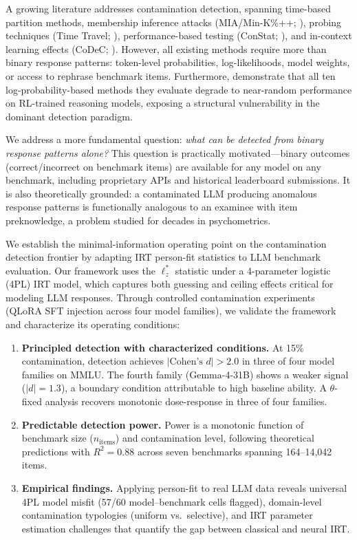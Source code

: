 \documentclass[11pt,a4paper]{article}
\begin{document}
A growing literature addresses contamination detection, spanning time-based partition methods, membership inference attacks (MIA/Min-K\%++; \citealp{shi2024detecting}), probing techniques (Time Travel; \citealp{deng2024investigating}), performance-based testing (ConStat; \citealp{oren2024proving}), and in-context learning effects (CoDeC; \citealp{dong2024codec}).
However, all existing methods require more than binary response patterns: token-level probabilities, log-likelihoods, model weights, or access to rephrase benchmark items.
Furthermore, \citet{wang2025rlcontam} demonstrate that all ten log-probability-based methods they evaluate degrade to near-random performance on RL-trained reasoning models, exposing a structural vulnerability in the dominant detection paradigm.

We address a more fundamental question: \emph{what can be detected from binary response patterns alone?}
This question is practically motivated---binary outcomes (correct/incorrect on benchmark items) are available for any model on any benchmark, including proprietary APIs and historical leaderboard submissions.
It is also theoretically grounded: a contaminated LLM producing anomalous response patterns is functionally analogous to an examinee with item preknowledge, a problem studied for decades in psychometrics.

We establish the minimal-information operating point on the contamination detection frontier by adapting IRT person-fit statistics \citep{drasgow1985appropriateness,snijders2001item} to LLM benchmark evaluation.
Our framework uses the $\ell_z^*$ statistic under a 4-parameter logistic (4PL) IRT model, which captures both guessing and ceiling effects critical for modeling LLM responses.
Through controlled contamination experiments (QLoRA SFT injection across four model families), we validate the framework and characterize its operating conditions:

\begin{enumerate}
\item \textbf{Principled detection with characterized conditions.} At 15\% contamination, detection achieves $|\text{Cohen's } d| > 2.0$ in three of four model families on MMLU.
The fourth family (Gemma-4-31B) shows a weaker signal ($|d|=1.3$), a boundary condition attributable to high baseline ability.
A $\theta$-fixed analysis recovers monotonic dose-response in three of four families.

\item \textbf{Predictable detection power.} Power is a monotonic function of benchmark size ($n_\text{items}$) and contamination level, following theoretical predictions with $R^2=0.88$ across seven benchmarks spanning 164--14,042 items.

\item \textbf{Empirical findings.} Applying person-fit to real LLM data reveals universal 4PL model misfit (57/60 model--benchmark cells flagged), domain-level contamination typologies (uniform vs.\ selective), and IRT parameter estimation challenges that quantify the gap between classical and neural IRT.
\end{enumerate}
\end{document}
